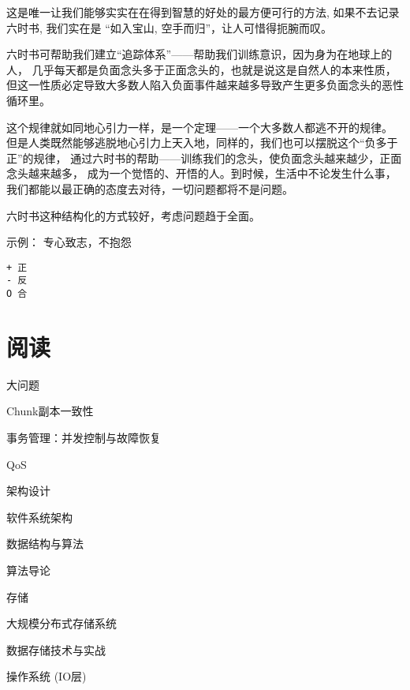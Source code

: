 \begin{tcolorbox}
这是唯一让我们能够实实在在得到智慧的好处的最方便可行的方法, 如果不去记录六时书, 
我们实在是 “如入宝山, 空手而归”，让人可惜得扼腕而叹。

六时书可帮助我们建立“追踪体系”——帮助我们训练意识，因为身为在地球上的人，
几乎每天都是负面念头多于正面念头的，也就是说这是自然人的本来性质，
但这一性质必定导致大多数人陷入负面事件越来越多导致产生更多负面念头的恶性循环里。

这个规律就如同地心引力一样，是一个定理——一个大多数人都逃不开的规律。
但是人类既然能够逃脱地心引力上天入地，同样的，我们也可以摆脱这个“负多于正”的规律，
通过六时书的帮助——训练我们的念头，使负面念头越来越少，正面念头越来越多，
成为一个觉悟的、开悟的人。到时候，生活中不论发生什么事，
我们都能以最正确的态度去对待，一切问题都将不是问题。
\end{tcolorbox}

六时书这种结构化的方式较好，考虑问题趋于全面。

示例： 专心致志，不抱怨

\begin{lstlisting}
+ 正
- 反
O 合
\end{lstlisting}

\section{阅读}

大问题
\begin{enumbox}
\item Chunk副本一致性
\item 事务管理：并发控制与故障恢复
\item QoS
\end{enumbox}

架构设计
\begin{enumbox}
\item 软件系统架构
\end{enumbox}

数据结构与算法
\begin{enumbox}
\item 算法导论
\end{enumbox}

存储
\begin{enumbox}
\item 大规模分布式存储系统
\item 数据存储技术与实战
\item 操作系统 (IO层)
\end{enumbox}

